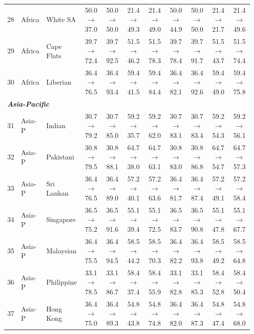\begin{table}[t]
{\begin{tabular}{rll c c c c c c c c}
28 & Africa & White SA & 50.0$\rightarrow$37.0 & 50.0$\rightarrow$50.0 & 21.4$\rightarrow$49.3 & 21.4$\rightarrow$49.0 & 50.0$\rightarrow$44.9 & 50.0$\rightarrow$50.0 & 21.4$\rightarrow$21.7 & 21.4$\rightarrow$49.6 \\
29 & Africa & Cape Flats & 39.7$\rightarrow$72.4 & 39.7$\rightarrow$92.5 & 51.5$\rightarrow$46.2 & 51.5$\rightarrow$78.3 & 39.7$\rightarrow$78.4 & 39.7$\rightarrow$91.7 & 51.5$\rightarrow$43.7 & 51.5$\rightarrow$74.4 \\
30 & Africa & Liberian & 36.4$\rightarrow$76.5 & 36.4$\rightarrow$93.4 & 59.4$\rightarrow$41.5 & 59.4$\rightarrow$84.4 & 36.4$\rightarrow$82.1 & 36.4$\rightarrow$92.6 & 59.4$\rightarrow$49.0 & 59.4$\rightarrow$75.8 \\
\midrule
\multicolumn{11}{l}{\textit{\textbf{Asia-Pacific}}} \\
31 & Asia-P & Indian & 30.7$\rightarrow$79.2 & 30.7$\rightarrow$85.0 & 59.2$\rightarrow$35.7 & 59.2$\rightarrow$62.0 & 30.7$\rightarrow$83.1 & 30.7$\rightarrow$83.4 & 59.2$\rightarrow$54.3 & 59.2$\rightarrow$56.1 \\
32 & Asia-P & Pakistani & 30.8$\rightarrow$79.5 & 30.8$\rightarrow$88.1 & 64.7$\rightarrow$38.0 & 64.7$\rightarrow$63.1 & 30.8$\rightarrow$83.0 & 30.8$\rightarrow$86.8 & 64.7$\rightarrow$54.7 & 64.7$\rightarrow$57.3 \\
33 & Asia-P & Sri Lankan & 36.4$\rightarrow$76.5 & 36.4$\rightarrow$89.0 & 57.2$\rightarrow$40.1 & 57.2$\rightarrow$63.6 & 36.4$\rightarrow$81.7 & 36.4$\rightarrow$87.4 & 57.2$\rightarrow$49.1 & 57.2$\rightarrow$58.4 \\
34 & Asia-P & Singapore & 36.5$\rightarrow$75.2 & 36.5$\rightarrow$91.6 & 55.1$\rightarrow$39.4 & 55.1$\rightarrow$72.5 & 36.5$\rightarrow$83.7 & 36.5$\rightarrow$90.8 & 55.1$\rightarrow$47.8 & 55.1$\rightarrow$67.7 \\
35 & Asia-P & Malaysian & 36.4$\rightarrow$75.5 & 36.4$\rightarrow$94.5 & 58.5$\rightarrow$44.2 & 58.5$\rightarrow$70.3 & 36.4$\rightarrow$82.2 & 36.4$\rightarrow$93.8 & 58.5$\rightarrow$49.2 & 58.5$\rightarrow$64.8 \\
36 & Asia-P & Philippine & 33.1$\rightarrow$78.5 & 33.1$\rightarrow$86.7 & 58.4$\rightarrow$37.4 & 58.4$\rightarrow$55.9 & 33.1$\rightarrow$82.8 & 33.1$\rightarrow$85.3 & 58.4$\rightarrow$52.8 & 58.4$\rightarrow$50.4 \\
37 & Asia-P & Hong Kong & 36.4$\rightarrow$75.0 & 36.4$\rightarrow$89.3 & 54.8$\rightarrow$43.8 & 54.8$\rightarrow$74.8 & 36.4$\rightarrow$82.0 & 36.4$\rightarrow$87.3 & 54.8$\rightarrow$47.4 & 54.8$\rightarrow$68.0 \\

\end{tabular}}
\end{table}
